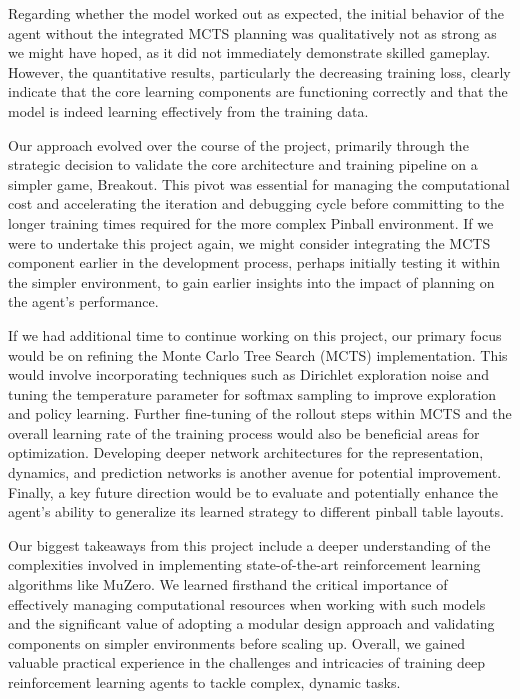 \documentclass{article}
\begin{document}
Regarding whether the model worked out as expected, the initial behavior of the agent without the integrated MCTS planning was qualitatively not as strong as we might have hoped, as it did not immediately demonstrate skilled gameplay. However, the quantitative results, particularly the decreasing training loss, clearly indicate that the core learning components are functioning correctly and that the model is indeed learning effectively from the training data.

Our approach evolved over the course of the project, primarily through the strategic decision to validate the core architecture and training pipeline on a simpler game, Breakout. This pivot was essential for managing the computational cost and accelerating the iteration and debugging cycle before committing to the longer training times required for the more complex Pinball environment. If we were to undertake this project again, we might consider integrating the MCTS component earlier in the development process, perhaps initially testing it within the simpler environment, to gain earlier insights into the impact of planning on the agent's performance.

If we had additional time to continue working on this project, our primary focus would be on refining the Monte Carlo Tree Search (MCTS) implementation. This would involve incorporating techniques such as Dirichlet exploration noise and tuning the temperature parameter for softmax sampling to improve exploration and policy learning. Further fine-tuning of the rollout steps within MCTS and the overall learning rate of the training process would also be beneficial areas for optimization. Developing deeper network architectures for the representation, dynamics, and prediction networks is another avenue for potential improvement. Finally, a key future direction would be to evaluate and potentially enhance the agent's ability to generalize its learned strategy to different pinball table layouts.

Our biggest takeaways from this project include a deeper understanding of the complexities involved in implementing state-of-the-art reinforcement learning algorithms like MuZero. We learned firsthand the critical importance of effectively managing computational resources when working with such models and the significant value of adopting a modular design approach and validating components on simpler environments before scaling up. Overall, we gained valuable practical experience in the challenges and intricacies of training deep reinforcement learning agents to tackle complex, dynamic tasks.
\end{document}
